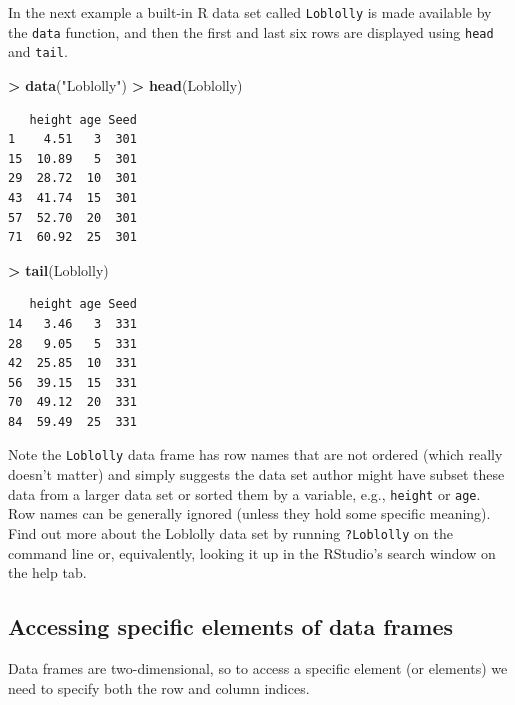 \documentclass[]{krantz}
\makeatletter
\newenvironment{Shaded}{\begin{snugshade}}{\end{snugshade}}
\newcommand{\KeywordTok}[1]{\textcolor[rgb]{0.27,0.27,0.27}{\textbf{#1}}}
\newcommand{\NormalTok}[1]{#1}
\newcommand{\OperatorTok}[1]{\textcolor[rgb]{0.43,0.43,0.43}{\textbf{#1}}}
\newcommand{\StringTok}[1]{\textcolor[rgb]{0.5,0.5,0.5}{#1}}
\newenvironment{kframe}{%
\medskip{}
\setlength{\fboxsep}{.8em}
 \def\at@end@of@kframe{}%
 \ifinner\ifhmode%
  \def\at@end@of@kframe{\end{minipage}}%
  \begin{minipage}{\columnwidth}%
 \fi\fi%
 \def\FrameCommand##1{\hskip\@totalleftmargin \hskip-\fboxsep
 \colorbox{shadecolor}{##1}\hskip-\fboxsep
     \hskip-\linewidth \hskip-\@totalleftmargin \hskip\columnwidth}%
 \MakeFramed {\advance\hsize-\width
   \@totalleftmargin\z@ \linewidth\hsize
   \@setminipage}}%
 {\par\unskip\endMakeFramed%
 \at@end@of@kframe}
\renewenvironment{Shaded}{\begin{kframe}}{\end{kframe}}
\makeatother
\begin{document}
In the next example a built-in R data set called \texttt{Loblolly} is made available by the \texttt{data} function, and then the first and last six rows are displayed using \texttt{head} and \texttt{tail}.

\begin{Shaded}
\begin{Highlighting}[]
\OperatorTok{>}\StringTok{ }\KeywordTok{data}\NormalTok{(}\StringTok{"Loblolly"}\NormalTok{)}
\OperatorTok{>}\StringTok{ }\KeywordTok{head}\NormalTok{(Loblolly)}
\end{Highlighting}
\end{Shaded}

\begin{verbatim}
   height age Seed
1    4.51   3  301
15  10.89   5  301
29  28.72  10  301
43  41.74  15  301
57  52.70  20  301
71  60.92  25  301
\end{verbatim}

\begin{Shaded}
\begin{Highlighting}[]
\OperatorTok{>}\StringTok{ }\KeywordTok{tail}\NormalTok{(Loblolly)}
\end{Highlighting}
\end{Shaded}

\begin{verbatim}
   height age Seed
14   3.46   3  331
28   9.05   5  331
42  25.85  10  331
56  39.15  15  331
70  49.12  20  331
84  59.49  25  331
\end{verbatim}

Note the \texttt{Loblolly} data frame has row names that are not ordered (which really doesn't matter) and simply suggests the data set author might have subset these data from a larger data set or sorted them by a variable, e.g., \texttt{height} or \texttt{age}. Row names can be generally ignored (unless they hold some specific meaning). Find out more about the Loblolly data set by running \texttt{?Loblolly} on the command line or, equivalently, looking it up in the RStudio's search window on the help tab.

\hypertarget{accessing-specific-elements-of-data-frames}{%
\subsection{Accessing specific elements of data frames}\label{accessing-specific-elements-of-data-frames}}

Data frames are two-dimensional, so to access a specific element (or elements) we need to specify both the row and column indices.
\end{document}
